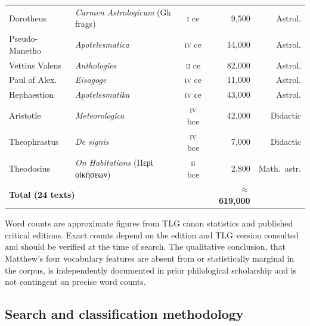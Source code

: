 \documentclass[11pt,a4paper]{article}
\begin{document}
\begin{table}[h]
\begin{tabular}{@{}lp{5cm}crr@{}}
Dorotheus        & \textit{Carmen Astrologicum} (Gk frags)     & \textsc{i} ce   &   9,500 & Astrol. \\
Pseudo-Manetho   & \textit{Apotelesmatica}                     & \textsc{iv} ce  &  14,000 & Astrol. \\
Vettius Valens   & \textit{Anthologies}                        & \textsc{ii} ce  &  82,000 & Astrol. \\
Paul of Alex. & \textit{Eisagoge}                           & \textsc{iv} ce  &  11,000 & Astrol. \\
Hephaestion      & \textit{Apotelesmatika}                     & \textsc{iv} ce  &  43,000 & Astrol. \\
Aristotle        & \textit{Meteorologica}                      & \textsc{iv} bce &  42,000 & Didactic \\
Theophrastus     & \textit{De signis}                          & \textsc{iv} bce &   7,000 & Didactic \\
Theodosius       & \textit{On Habitations} (Περὶ οἰκήσεων)    & \textsc{ii} bce &   2,800 & Math.~astr. \\
\midrule
\multicolumn{3}{l}{\textbf{Total (24 texts)}} & \textbf{$\approx$619,000} & \\
\bottomrule
\end{tabular}
\smallskip\par
{\small Word counts are approximate figures from TLG canon statistics and
published critical editions. Exact counts depend on the edition and TLG
version consulted and should be verified at the time of search. The
qualitative conclusion, that Matthew's four vocabulary features are absent
from or statistically marginal in the corpus, is independently documented
in prior philological scholarship and is not contingent on precise
word counts.}
\end{table}

\subsection{Search and classification methodology}
\end{document}
